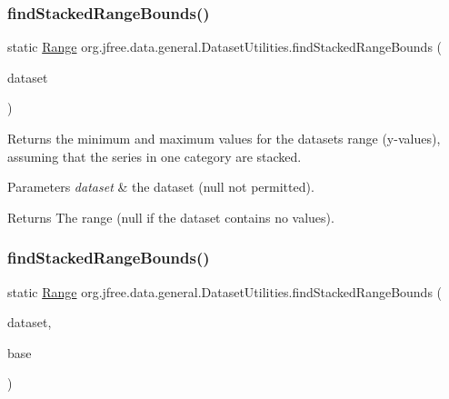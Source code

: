 \subsubsection{\texorpdfstring{find\+Stacked\+Range\+Bounds()}{findStackedRangeBounds()}\hspace{0.1cm}{\footnotesize\ttfamily [1/5]}}
{\footnotesize\ttfamily static \mbox{\hyperlink{classorg_1_1jfree_1_1data_1_1_range}{Range}} org.\+jfree.\+data.\+general.\+Dataset\+Utilities.\+find\+Stacked\+Range\+Bounds (\begin{DoxyParamCaption}\item[{\mbox{\hyperlink{interfaceorg_1_1jfree_1_1data_1_1category_1_1_category_dataset}{Category\+Dataset}}}]{dataset }\end{DoxyParamCaption})\hspace{0.3cm}{\ttfamily [static]}}

Returns the minimum and maximum values for the dataset\textquotesingle{}s range (y-\/values), assuming that the series in one category are stacked.


\begin{DoxyParams}{Parameters}
{\em dataset} & the dataset ({\ttfamily null} not permitted).\\
\hline
\end{DoxyParams}
\begin{DoxyReturn}{Returns}
The range ({\ttfamily null} if the dataset contains no values). 
\end{DoxyReturn}
\mbox{\label{classorg_1_1jfree_1_1data_1_1general_1_1_dataset_utilities_a2183f33e3f21871ef58484671a7bfd95}} 
\subsubsection{\texorpdfstring{find\+Stacked\+Range\+Bounds()}{findStackedRangeBounds()}\hspace{0.1cm}{\footnotesize\ttfamily [2/5]}}
{\footnotesize\ttfamily static \mbox{\hyperlink{classorg_1_1jfree_1_1data_1_1_range}{Range}} org.\+jfree.\+data.\+general.\+Dataset\+Utilities.\+find\+Stacked\+Range\+Bounds (\begin{DoxyParamCaption}\item[{\mbox{\hyperlink{interfaceorg_1_1jfree_1_1data_1_1category_1_1_category_dataset}{Category\+Dataset}}}]{dataset,  }\item[{double}]{base }\end{DoxyParamCaption})\hspace{0.3cm}{\ttfamily [static]}}

